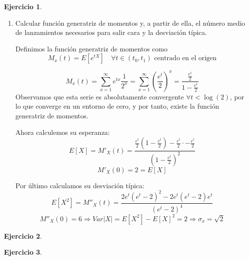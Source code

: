 \documentclass[a4paper, 12pt]{article}
\theoremstyle{definition}
\newtheorem{ej}{Ejercicio}
\begin{document}
\begin{ej}
\begin{enumerate}[label=\textit{\alph*)}]
	\item Calcular función generatriz de momentos y, a partir de ella, el número medio de lanzamientos necesarios para salir cara y la desviación típica.
	
Definimos la función generatriz de momentos como
\[
M_x(t) = E[e^{tX}] \quad \forall t \in (t_0, t_1) \text{ centrado en el origen}
\]

\[
	M_x(t) = \sum_{x=1}^{\infty} e^{tx} \frac{1}{2^x} = \sum_{x=1}^{\infty} \left( \frac{e^t}{2} \right)^x = \frac{\frac{e^t}{2}}{1- \frac{e^t}{2}}
\]
Observamos que esta serie es absolutamente convergente \(\forall t < \log (2)\), por lo que converge en un entorno de cero, y por tanto, existe la función generatriz de momentos.

Ahora calculemos su esperanza:
\[
	E[X] = M'_X(t) = \frac{\frac{e^t}{2}(1-\frac{e^t}{2}) - \frac{e^t}{2} \cdot - \frac{e^t}{2}}{(1-\frac{e^t}{2})^2}
\]
\[
	M'_X(0) = 2 = E[X]
\]

Por último calculamos su desviación típica:
\[
	E[X^2] = M''_X(t) = \frac{2e^t (e^t -2)^2 - 2e^t (e^t-2)e^t}{(e^t-2)^4}
\]
\[
	M''_X(0) = 6 \Rightarrow Var|X| = E[X^2] - E[X]^2 = 2 \Rightarrow \sigma_x = \sqrt{2}
\]

\end{enumerate}

\end{ej}

\begin{ej}

\end{ej}

\begin{ej}

\end{ej}
\end{document}
